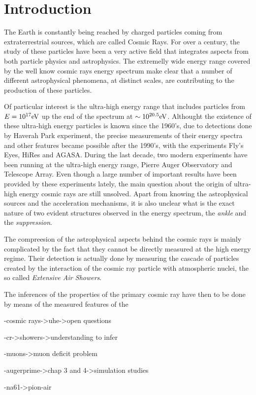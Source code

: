 \chapter[Introduction]{Introduction}
\label{sec:introduction}

The Earth is constantly being reached by charged particles
coming from extraterrestrial sources, which are called Cosmic Rays.
For over a century, the study of these particles have been a very active field
that integrates aspects from both particle physics and astrophysics.
The extremelly wide energy range covered by the well know cosmic rays
energy spectrum make clear that a number of different astrophysical phenomena,
at distinct scales, are contributing to the production of these particles.

Of particular interest is the ultra-high energy range that includes
particles from $E=\mbox{$10^{17}$} \mbox{e\kern-0.1em V}$ up the end of the spectrum at $\sim\mbox{$10^{20.5}$} \mbox{e\kern-0.1em V}$. 
Althought the existence of these ultra-high energy particles is known
since the 1960's, due to detections done by Haverah Park experiment,
the precise measurements of their energy spectra and other features
became possible after the 1990's, with the experiments Fly's Eyes,
HiRes and AGASA. During the last decade, two modern experiments have
been running at the ultra-high energy range, Pierre Auger Observatory
and Telescope Array.
Even though a large number of important results have been provided
by these experiments lately, the main question about the origin
of ultra-high energy cosmic rays are still unsolved. 
Apart from knowing the astrophysical sources and the acceleration
mechanisms, it is also unclear what is the exact nature of two evident structures
observed in the energy spectrum, the \emph{ankle} and the \emph{suppression}.


The compreesion of the astrophysical aspects behind the cosmic rays
is mainly complicated by the fact that they cannot be directly measured
at the high energy regime. Their detection is actually done by measuring
the cascade of particles created by the interaction of the cosmic ray particle
with atmospheric nuclei, the so called \emph{Extensive Air Showers}.  


The inferences of the properties of the primary cosmic ray have then
to be done by means of the measured features of the 





-cosmic rays->uhe->open questions

-cr->showers->understanding to infer

-muons->muon deficit problem

-augerprime->chap 3 and 4->simulation studies

-na61->pion-air






